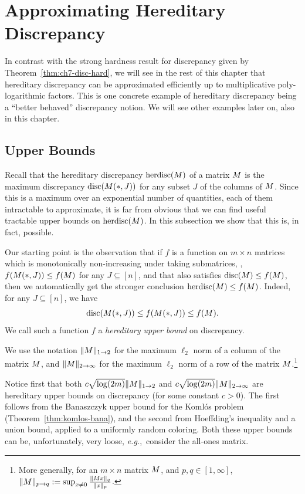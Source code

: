\section{Approximating Hereditary Discrepancy}
  
In contrast with the strong hardness result for discrepancy given by
Theorem~\ref{thm:ch7-disc-hard}, we will see in the rest of this
chapter that hereditary discrepancy can be approximated efficiently up
to multiplicative poly-logarithmic factors. This is one concrete
example of hereditary discrepancy being a ``better behaved''
discrepancy notion. We will see other examples later on, also in this
chapter.

\subsection{Upper Bounds}

Recall that the hereditary discrepancy $\operatorname{herdisc}(M)$ of a matrix
$M$ is the maximum discrepancy $\operatorname{disc}(M(*,J))$ for any subset
$J$ of the columns of $M$. Since this is a maximum over an exponential
number of quantities, each of them intractable to approximate, it is
far from obvious that we can find useful tractable upper bounds on
$\operatorname{herdisc}(M)$. In this subsection we show that this is, in fact,
possible. 

Our starting point is the observation that if $f$ is a function on
$m\times n$ matrices which is monotonically non-increasing under
taking submatrices, \ie, $f(M(*,J)) \le f(M)$ for any $J
\subseteq [n]$, and that also satisfies $\operatorname{disc}(M) \le f(M)$, then we
automatically get the stronger conclusion $\operatorname{herdisc}(M) \le
f(M)$. Indeed, for any $J \subseteq [n]$, we have
\[
  \operatorname{disc}(M(*,J)) \le f(M(*,J)) \le f(M).
\]
We call such a function $f$ a {\em hereditary upper bound} on discrepancy.

We use the notation $\|M\|_{1\to 2}$ for the maximum $\ell_2$ norm
of a column of the matrix $M$, and $\|M\|_{2\to\infty}$ for the
maximum $\ell_2$ norm of a row of the matrix $M$.\footnote{More
  generally, for an $m\times n$ matrix $M$, and
  $p,q \in [1,\infty]$,
  $\|M\|_{p\to q} := \sup_{x\neq 0} \frac{\|M
    x\|_q}{\|x\|_p}$. }

Notice first that both $c\sqrt{\log(2m)}\|M\|_{1\to 2}$ and
$c\sqrt{\log(2m)}\|M\|_{2\to\infty}$ are hereditary upper bounds on
discrepancy (for some constant $c>0$). The first follows from the Banaszczyk  upper bound for
the Koml\'os problem (Theorem~\ref{thm:komlos-bana}), and the second
from Hoeffding's inequality and a union bound, applied to a uniformly
random coloring.
Both these upper bounds can be, unfortunately, very loose, {\em e.g.},~consider
the all-ones matrix. 


